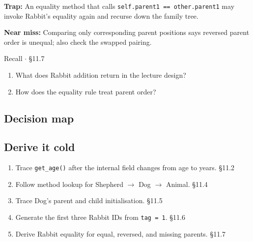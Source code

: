 \documentclass[11pt]{article}
\begin{document}
\begin{keepsection}
\begin{notebox}\textbf{Trap:} An equality method that calls \texttt{self.parent1 == other.parent1} may invoke Rabbit’s equality again and recurse down the family tree.\end{notebox}

\begin{notebox}\textbf{Near miss:} Comparing only corresponding parent positions says reversed parent order is unequal; also check the swapped pairing.\end{notebox}

\begin{recallbox}{Recall \ensuremath{\cdot} §11.7}
\begin{enumerate}
\item What does Rabbit addition return in the lecture design?
\item How does the equality rule treat parent order?
\end{enumerate}

\end{recallbox}
\end{keepsection}

\begin{keepsection}
\section{Decision map}
\end{keepsection}

\begin{keepsection}
\section{Derive it cold}

\begin{enumerate}
\item Trace \texttt{get\_age()} after the internal field changes from age to years. \hfill{\small\color{FAUblue}§11.2}
\item Follow method lookup for Shepherd \ensuremath{\to} Dog \ensuremath{\to} Animal. \hfill{\small\color{FAUblue}§11.4}
\item Trace Dog’s parent and child initialisation. \hfill{\small\color{FAUblue}§11.5}
\item Generate the first three Rabbit IDs from \texttt{tag = 1}. \hfill{\small\color{FAUblue}§11.6}
\item Derive Rabbit equality for equal, reversed, and missing parents. \hfill{\small\color{FAUblue}§11.7}
\end{enumerate}
\end{keepsection}
\end{document}
